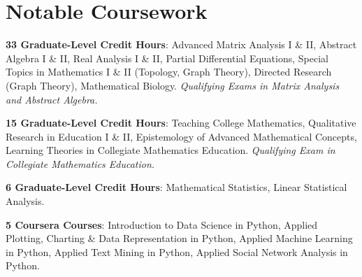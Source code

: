 \documentclass[10pt,a4paper,sans]{moderncv}
\begin{document}
	\section{Notable Coursework}
	{\textbf{33 Graduate-Level Credit Hours}: Advanced Matrix Analysis I \& II, Abstract Algebra I \& II, Real Analysis I \& II,  Partial Differential Equations, Special Topics in Mathematics I \& II (Topology, Graph Theory), Directed Research (Graph Theory), Mathematical Biology. \textit{Qualifying Exams in Matrix Analysis and Abstract Algebra.} }
	
	{\textbf{15 Graduate-Level Credit Hours}: Teaching College Mathematics, Qualitative Research in Education I \& II, Epistemology of Advanced Mathematical Concepts, Learning Theories in Collegiate Mathematics Education. \textit{Qualifying Exam in Collegiate Mathematics Education.} }
	
	{\textbf{6 Graduate-Level Credit Hours}: Mathematical Statistics, Linear Statistical Analysis.}
	
	{\textbf{5 Coursera Courses}: Introduction to Data Science in Python, Applied Plotting, Charting \& Data Representation in Python, Applied Machine Learning in Python, Applied Text Mining in Python, Applied Social Network Analysis in Python.}
	
\end{document}
